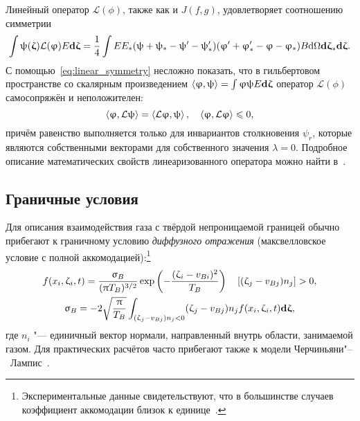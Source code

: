 Линейный оператор \(\mathcal{L}(\phi)\), также как и \(J(f,g)\), удовлетворяет соотношению симметрии
\begin{equation}\label{eq:linear_symmetry}
    \int\uppsi({\boldsymbol{\upzeta}})\mathcal{L}(\upvarphi)E\boldsymbol{\mathrm{d}\upzeta} = \frac14\int EE_* (\uppsi+\uppsi_*-\uppsi'-\uppsi'_*)
        (\upvarphi'+\upvarphi'_*-\upvarphi-\upvarphi_*) B\mathrm{d}\Omega\boldsymbol{\mathrm{d}\upzeta}_*\boldsymbol{\mathrm{d}\upzeta}.
\end{equation}
С помощью~\eqref{eq:linear_symmetry} несложно показать, что в гильбертовом пространстве
со скалярным произведением \( \left\langle{\upvarphi},{\uppsi}\right\rangle = \int\upvarphi\uppsi E\boldsymbol{\mathrm{d}\upzeta}\)
оператор \(\mathcal{L}(\phi)\) самосопряжён и неположителен:
\begin{equation}\label{eq:linear_properties}
    \left\langle{\upvarphi},{\mathcal{L}\uppsi}\right\rangle = \left\langle{\mathcal{L}\upvarphi},{\uppsi}\right\rangle, \quad
    \left\langle{\upvarphi},{\mathcal{L}\upvarphi}\right\rangle \leqslant 0,
\end{equation}
причём равенство выполняется только для инвариантов столкновения \(\psi_r\),
которые являются собственными векторами для собственного значения \(\lambda = 0\).
Подробное описание математических свойств линеаризованного оператора можно найти в~\cite{Cercignani2006}.


\subsection{Граничные условия}


Для описания взаимодействия газа с твёрдой непроницаемой границей обычно прибегают
к граничному условию \emph{диффузного отражения} (максвелловское условие с полной аккомодацией):\footnote{
    Экспериментальные данные свидетельствуют, что в большинстве случаев коэффициент аккомодации близок к единице~\cite{Agrawal2008}.
}
\begin{equation}\label{eq:diffuse_bc}
    \begin{gathered}
        f(x_i, \upzeta_i, t) = \frac{\upsigma_B}{(\uppi T_B)^{3/2}}
            \exp\left( -\frac{(\upzeta_i-v_{Bi})^2}{T_B} \right) \quad \left[(\upzeta_j-v_{Bj}) n_j\right] > 0, \\
        \upsigma_B = -2\sqrt\frac{\uppi}{T_B}
            \int_{(\upzeta_j-v_{Bj})n_j < 0} (\upzeta_j-v_{Bj}) n_j f(x_i, \upzeta_i, t) \boldsymbol{\mathrm{d}\upzeta},
    \end{gathered}
\end{equation}
где \(n_i\) "--- единичный вектор нормали, направленный внутрь области, занимаемой газом.
Для практических расчётов часто прибегают также к модели Черчиньяни"--~Лампис~\cite{Cercignani1971, Cercignani2006}.

